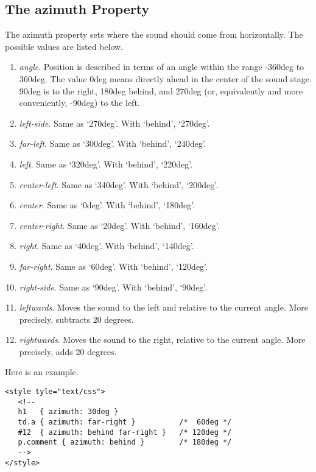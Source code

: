 \documentclass[a4paper,oneside]{book}
\numberwithin{equation}{chapter}
\begin{document}
\subsection{The azimuth Property}
The azimuth property sets where the sound should come from horizontally. The possible values are listed below.
\begin{enumerate}
\item \textit{angle}. Position is described in terms of an angle within the range -360deg to 360deg. The value 0deg means directly ahead in the center of the sound stage. 90deg is to the right, 180deg behind, and 270deg (or, equivalently and more conveniently, -90deg) to the left.
\item \textit{left-side}. Same as `270deg'. With `behind', `270deg'.
\item \textit{far-left}. Same as `300deg'. With `behind', `240deg'.
\item \textit{left}. Same as `320deg'. With `behind', `220deg'.
\item \textit{center-left}. Same as `340deg'. With `behind', `200deg'.
\item \textit{center}. Same as `0deg'. With `behind', `180deg'.
\item \textit{center-right}. Same as `20deg'. With `behind', `160deg'.
\item \textit{right}. Same as `40deg'. With `behind', `140deg'.
\item \textit{far-right}. Same as `60deg'. With `behind', `120deg'.
\item \textit{right-side}. Same as `90deg'. With `behind', `90deg'.
\item \textit{leftwards}. Moves the sound to the left and relative to the current angle. More precisely, subtracts 20 degrees.
\item \textit{rightwards}. Moves the sound to the right, relative to the current angle. More precisely, adds 20 degrees.
\end{enumerate}
Here is an example.
\begin{verbatim}
<style tyle="text/css">
   <!--
   h1   { azimuth: 30deg }
   td.a { azimuth: far-right }          /*  60deg */
   #12  { azimuth: behind far-right }   /* 120deg */
   p.comment { azimuth: behind }        /* 180deg */
   -->
</style>
\end{verbatim}
\end{document}
